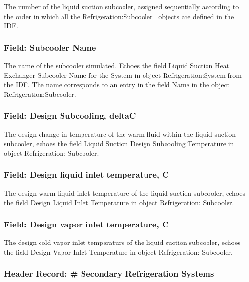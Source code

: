 The number of the liquid suction subcooler, assigned sequentially according to the order in which all the Refrigeration:Subcooler~ objects are defined in the IDF.

\subsubsection{Field: Subcooler Name}\label{field-subcooler-name-2}

The name of the subcooler simulated. Echoes the field Liquid Suction Heat Exchanger Subcooler Name for the System in object Refrigeration:System from the IDF. The name corresponds to an entry in the field Name in the object Refrigeration:Subcooler.

\subsubsection{Field: Design Subcooling, deltaC}\label{field-design-subcooling-deltac}

The design change in temperature of the warm fluid within the liquid suction subcooler, echoes the field Liquid Suction Design Subcooling Temperature in object Refrigeration: Subcooler.

\subsubsection{Field: Design liquid inlet temperature, C}\label{field-design-liquid-inlet-temperature-c}

The design warm liquid inlet temperature of the liquid suction subcooler, echoes the field Design Liquid Inlet Temperature in object Refrigeration: Subcooler.

\subsubsection{Field: Design vapor inlet temperature, C}\label{field-design-vapor-inlet-temperature-c}

The design cold vapor inlet temperature of the liquid suction subcooler, echoes the field Design Vapor Inlet Temperature in object Refrigeration: Subcooler.

\subsubsection{Header Record: \# Secondary Refrigeration Systems}\label{header-record-secondary-refrigeration-systems}

